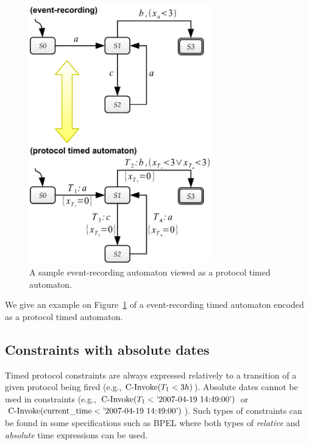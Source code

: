 \begin{figure}[htbp]
	\centering
  \includegraphics[width=0.7\textwidth]{content/protocol-model/era}
  \caption{A sample event-recording automaton viewed as a protocol timed automaton.}
  \label{fig:era}
\end{figure}

We give an example on Figure~\ref{fig:era} of a event-recording timed automaton encoded as a protocol timed automaton.


\subsection{Constraints with absolute dates}


Timed protocol constraints are always expressed relatively to a transition of a given protocol being fired (e.g., $\mbox{C-Invoke}(T_1 < 3h)$). Absolute dates cannot be used in constraints (e.g., $\mbox{C-Invoke}(T_1 < \mbox{'2007-04-19 14:49:00'})$ or $\mbox{C-Invoke}(\mbox{current\_time} < \mbox{'2007-04-19 14:49:00'})$). Such types of constraints can be found in some specifications such as BPEL \cite{WSBPEL2} where both types of \emph{relative} and \emph{absolute} time expressions can be used.\\

